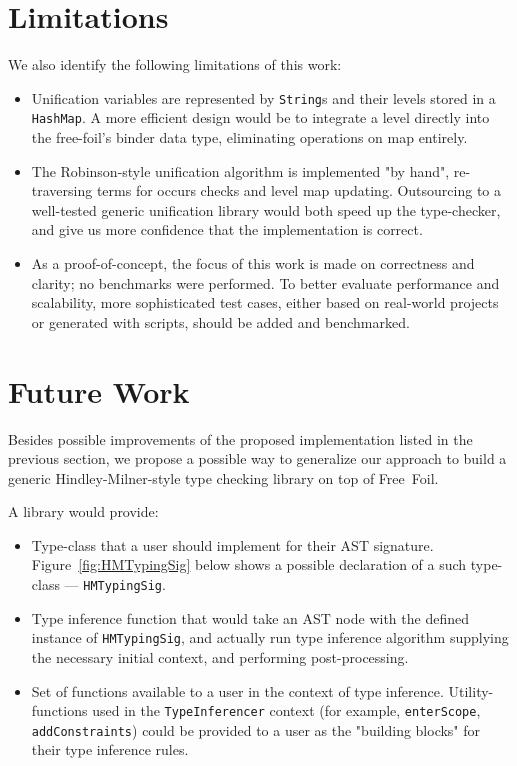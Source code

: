 \section{Limitations}

We also identify the following limitations of this work:

\begin{itemize}
  \item Unification variables are represented by \texttt{String}s and their levels stored in a \texttt{HashMap}. A more efficient design would be to integrate a level directly into the free-foil's binder data type, eliminating operations on map entirely.
  \item The Robinson-style unification algorithm is implemented "by hand", re-traversing terms for occurs checks and level map updating. Outsourcing to a well-tested generic unification library would both speed up the type-checker, and give us more confidence that the implementation is correct.
  \item As a proof-of-concept, the focus of this work is made on correctness and clarity; no benchmarks were performed. To better evaluate performance and scalability, more sophisticated test cases, either based on real-world projects or generated with scripts, should be added and benchmarked.
\end{itemize}

\section{Future Work}

Besides possible improvements of the proposed implementation listed in the previous section, we propose a possible way to generalize our approach to build a generic Hindley-Milner-style type checking library on top of Free~Foil.

A library would provide:

\begin{itemize}
  \item Type-class that a user should implement for their AST signature. Figure~\ref{fig:HMTypingSig} below shows a possible declaration of a such type-class — \texttt{HMTypingSig}.
  \item Type inference function that would take an AST node with the defined instance of \texttt{HMTypingSig}, and actually run type inference algorithm supplying the necessary initial context, and performing post-processing.
  \item Set of functions available to a user in the context of type inference. Utility-functions used in the \texttt{TypeInferencer} context (for example, \texttt{enterScope}, \texttt{addConstraints}) could be provided to a user as the "building blocks" for their type inference rules.
\end{itemize}

